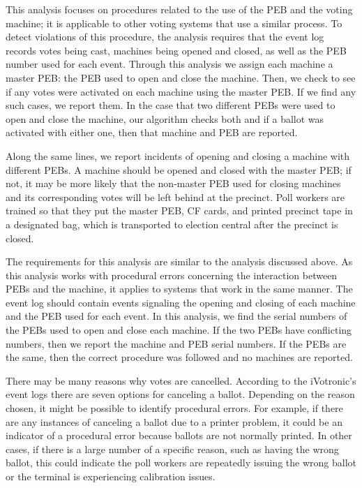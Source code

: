 This analysis focuses on procedures related to the use of the PEB and the voting
machine; it is applicable to other voting systems that use a similar process.
To detect violations of this procedure, the analysis requires that the event log
records votes being cast, machines being opened and closed, as well as the PEB
number used for each event.  Through this analysis we assign each machine a
master PEB: the PEB used to open and close the machine. Then, we check to see if
any votes were activated on each 
machine using the master PEB.  If we find any such cases, we report them.  In
the case that two different PEBs were
used to open and close the machine, our algorithm
checks both and if a ballot was activated with either one,
then that machine and PEB are reported.  


\label{sec:opening_closing_diff_pebs}
Along the same lines, we report incidents of opening and closing a
machine with different PEBs. A machine should be opened and closed
with the master PEB; if not, it may be more likely that the non-master
PEB used for closing machines and its corresponding votes will be left behind at the precinct.  Poll workers are trained so that they put the master PEB, CF cards, and printed precinct tape in a designated bag, which is transported to election central after the precinct is closed.  

The requirements for this analysis are similar to the analysis discussed above.
As this analysis works with procedural errors concerning the interaction between
PEBs and the machine, it applies to systems that work in the same manner.  The
event log should contain events signaling the opening and closing of each
machine and the PEB used for each event.  In this analysis, we find the serial
numbers of the PEBs used to open and close each machine.  If the two PEBs have
conflicting numbers, then we report the machine and PEB serial numbers.  If the
PEBs are the same, then the correct procedure was followed and no machines are
reported.  


There may be
many reasons why votes are cancelled. According to the iVotronic’s event logs
there are seven options for canceling a ballot. Depending on the reason chosen, it
might be possible to identify procedural errors.  For example, if there are any
instances of canceling a ballot due to a printer problem, it could be an
indicator of a procedural error because ballots are not normally printed. In other
cases, if there is a large number of a specific reason, such as having the wrong
ballot, this could indicate the poll workers are repeatedly issuing the wrong
ballot or the terminal is experiencing calibration issues.  

